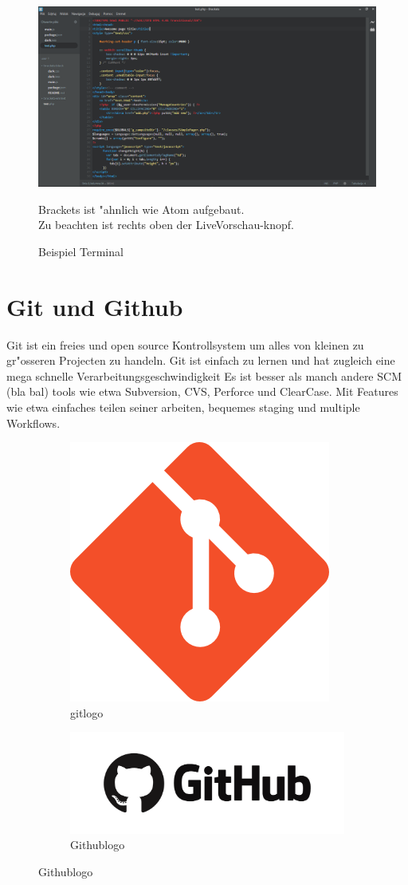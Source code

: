 \documentclass{article}
\begin{document}
    \begin{figure}[ht]
        \centering
        \includegraphics[width=.6\linewidth]{brackets}
        \caption{Beispiel Terminal}
        \label{fig:sub1}{Brackets ist "ahnlich wie Atom aufgebaut.\\
        Zu beachten ist rechts oben der LiveVorschau-knopf.}
        \end{figure}

\cleardoublepage












\section{Git und Github}
Git ist ein freies und open source Kontrollsystem um alles von kleinen zu gr"osseren
Projecten zu handeln.
Git ist einfach zu lernen und hat zugleich eine mega schnelle Verarbeitungsgeschwindigkeit
Es ist besser als manch andere SCM (bla bal) tools wie etwa Subversion, CVS, Perforce
und ClearCase.
Mit Features wie etwa einfaches teilen seiner arbeiten, bequemes staging und multiple Workflows.
\begin{figure}[ht]
\centering
\begin{subfigure}{.5\textwidth}
  \centering
  \includegraphics[width=.5\linewidth]{git_logo}
  \caption{gitlogo}
  \label{fig:sub1}
\end{subfigure}%
\begin{subfigure}{.5\textwidth}
  \centering
  \includegraphics[width=.5\linewidth]{github}
  \caption{Githublogo}
  \label{fig:sub2}
\end{subfigure}
\end{figure}
\end{document}
